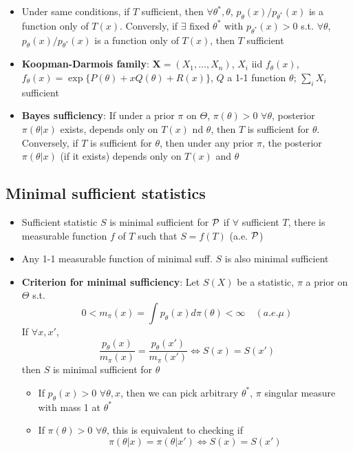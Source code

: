 \documentclass[fontsize=5pt]{scrartcl}
\begin{document}
\begin{multicols}{2}
\begin{itemize}
\item Under same conditions, if $T$ sufficient, then
  $\forall\theta^{*},\theta$, $p_{\theta}(x)/p_{\theta^{*}}(x)$ is a
  function only of $T(x)$. Conversly, if $\exists$ fixed $\theta^{*}$
  with $p_{\theta^{*}}(x)>0$ s.t. $\forall\theta$,
  $p_{\theta}(x)/p_{\theta^{*}}(x)$ is a function only of $T(x)$, then
  $T$ sufficient

\item \textbf{Koopman-Darmois family}:
  $\mathbf{X}=(X_{1},\dots,X_{n})$, $X_{i}$ iid $f_{\theta}(x)$,
  $f_{\theta}(x) = \exp\{P(\theta)+xQ(\theta)+R(x)\}$, $Q$ a 1-1
  function $\theta$; $\sum_{i}X_{i}$ sufficient

\item \textbf{Bayes sufficiency}: If under a prior $\pi$ on $\Theta$,
  $\pi(\theta)>0$ $\forall\theta$, posterior $\pi(\theta|x)$ exists,
  depends only on $T(x)$ nd $\theta$, then $T$ is sufficient for
  $\theta$. Conversely, if $T$ is sufficient for $\theta$, then under
  any prior $\pi$, the posterior $\pi(\theta|x)$ (if it exists)
  depends only on $T(x)$ and $\theta$

\end{itemize}

\subsection{Minimal sufficient statistics}

\begin{itemize}
\item Sufficient statistic $S$ is minimal sufficient for ${\cal P}$ if $\forall$
  sufficient $T$, there is measurable function $f$ of $T$ such that
  $S=f(T)$ (a.e. ${\cal P}$)
\item Any 1-1 measurable function of minimal suff. $S$ is also
  minimal sufficient
\item \textbf{Criterion for minimal sufficiency}: Let $S(X)$ be a
  statistic, $\pi$ a prior on $\Theta$ s.t.
  \begin{equation}
    0<m_{\pi}(x) = \int p_{\theta}(x)d\pi(\theta)<\infty\quad (a.e.\mu)
  \end{equation}
  If $\forall x, x'$,
  \begin{equation}
    \frac{p_{\theta}(x)}{m_{\pi}(x)}=\frac{p_{\theta}(x')}{m_{\pi}(x')}
    \iff S(x) = S(x')
  \end{equation}
  then $S$ is minimal sufficient for $\theta$
  \begin{itemize}
  \item If $p_{\theta}(x)>0$ $\forall\theta,x$, then we can pick
    arbitrary $\theta^{*}$, $\pi$ singular measure with mass 1 at
    $\theta^{*}$
  \item If $\pi(\theta)>0$ $\forall\theta$, this is equivalent to
    checking if
    \begin{equation}
      \pi(\theta|x) = \pi(\theta|x') \iff S(x) = S(x')
    \end{equation}
  \end{itemize}


\end{itemize}
\end{multicols}
\end{document}
